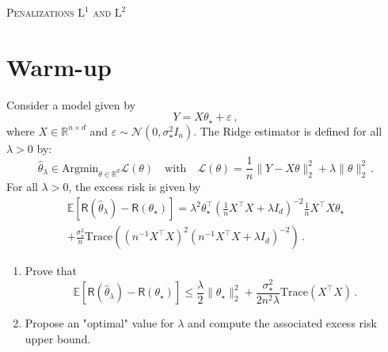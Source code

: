 \documentclass[a4paper,10pt,fleqn]{article}
\newcommand{\eqsp}{\,}
\newcommand{\1}{\ensuremath{\mathbbm{1}}}
\newcommand{\bE}{\mathbb{E}}
\newcommand{\param}{\theta}
\begin{document}
\noindent\hrulefill

\begin{center}
\textsc{Penalizations $\mathrm{L}^1$ and $\mathrm{L}^2$}
\end{center}
\hrulefill

\medskip

\section{Warm-up}
Consider a model given by 
$$
Y = X\theta_\star + \varepsilon\,,
$$
where $X\in\mathbb{R}^{n\times d}$ and $\varepsilon \sim \mathcal{N}(0,\sigma_\star^2I_n)$. The Ridge estimator  is defined for all $\lambda>0$ by:
$$
\widehat{\theta}_{\lambda}\in\mathrm{Argmin}_{\theta\in\mathbb{R}^d} \mathcal{L}(\theta)\quad\mathrm{with} \quad \mathcal{L}(\theta) = \frac{1}{n} \|Y-X\theta\|_2^2 + \lambda \|\theta\|_2^2\,.
 $$
For all $\lambda>0$, the excess risk is given by
\begin{multline*}
\bE\left[\mathsf{R}(\widehat \param_\lambda) - \mathsf{R}(\param_\star)\right] = \lambda^2\param_\star^\top\left(\frac{1}{n}X^\top X + \lambda I_d\right)^{-2} \frac{1}{n}X^\top X \param_\star \\
+\frac{\sigma_\star^{2}}{n}\mathrm{Trace}\left((n^{-1}X^\top X)^2(n^{-1}X^\top X + \lambda I_d)^{-2}\right)\eqsp.
\end{multline*}

\begin{enumerate}
\item Prove that 
$$
\bE\left[\mathsf{R}(\widehat \param_\lambda) - \mathsf{R}(\param_\star)\right]  \leqslant \frac{\lambda}{2}\|\param_\star\|_2^2 + \frac{\sigma_\star^{2}}{2n^2\lambda}\mathrm{Trace}\left(X^\top X\right)\eqsp.
$$
\item Propose an "optimal" value for $\lambda$ and  compute the associated excess risk upper bound.
\end{enumerate}
\end{document}
